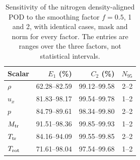 \begin{table}
\centering\small
\caption{Sensitivity of the nitrogen density-aligned POD to the smoothing factor $f=0.5$, 1 and 2, with identical cases, mask and norm for every factor. The entries are ranges over the three factors, not statistical intervals.}\label{tab:app_robustness_ranges}
\begin{tabular}{lrrr}\toprule
Scalar & $E_1$ (\%) & $C_2$ (\%) & $N_{95}$\\\midrule
$\rho$ & 62.28--82.59 & 99.12--99.58 & 2--2\\
$u_x$ & 81.83--98.17 & 99.54--99.78 & 1--2\\
$p$ & 84.79--89.61 & 98.34--99.80 & 2--2\\
$M_{\rm tr}$ & 91.51--98.36 & 99.85--99.93 & 1--2\\
$T_{\rm tr}$ & 84.16--94.09 & 99.55--99.85 & 2--2\\
$T_{\rm rot}$ & 71.61--98.04 & 97.54--99.68 & 1--2\\
\bottomrule\end{tabular}
\end{table}
